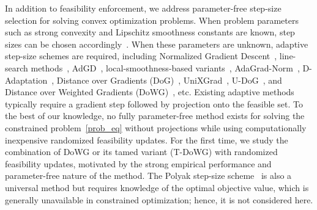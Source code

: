 \documentclass{article}
\theoremstyle{plain}
\theoremstyle{definition}
\theoremstyle{remark}
\begin{document}
In addition to feasibility enforcement, we address parameter-free step-size selection for solving convex optimization problems. When problem parameters such as strong convexity and Lipschitz smoothness constants are known, step sizes can be chosen accordingly~\cite{nedic2019random, chakraborty2024randomized}. When these parameters are unknown, adaptive step-size schemes are required, including Normalized Gradient Descent~\cite{shor2012minimization, nesterov2018lectures, levy2017online, grimmer2019convergence}, line-search methods~\cite{nesterov2015universal}, AdGD~\cite{malitsky2020adaptive, malitsky2024adaptive}, local-smoothness-based variants~\cite{latafat2024adaptive}, AdaGrad-Norm~\cite{levy2018online, ene2021adaptive, ward2020adagrad, traore2021sequential}, D-Adaptation~\cite{defazio2023learning}, Distance over Gradients (DoG)~\cite{ivgi2023dog}, UniXGrad~\cite{kavis2019unixgrad}, U-DoG~\cite{kreisler2024accelerated}, and Distance over Weighted Gradients (DoWG)~\cite{khaled2023dowg, khaled2024tuning}, etc. Existing adaptive methods typically require a gradient step followed by projection onto the feasible set. To the best of our knowledge, no fully parameter-free method exists for solving the constrained problem~\eqref{prob_eq} without projections while using computationally inexpensive randomized feasibility updates. For the first time, we study the combination of DoWG or its tamed variant (T-DoWG) with randomized feasibility updates, motivated by the strong empirical performance and parameter-free nature of the method. The Polyak step-size scheme~\cite{polyak1969minimization} is also a universal method but requires knowledge of the optimal objective value, which is generally unavailable in constrained optimization; hence, it is not considered here.
\end{document}

